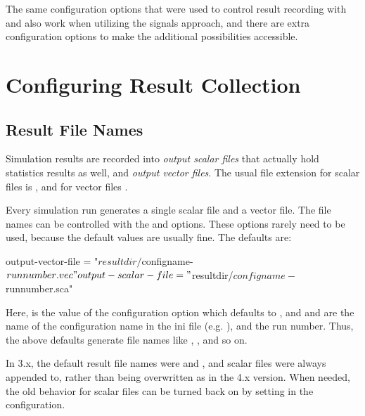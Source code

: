 The same configuration options that were used to control result recording
with  and  also work when utilizing
the signals approach, and there are extra configuration options to make
the additional possibilities accessible.


\section{Configuring Result Collection}
\label{sec:ana-sim:config-results}

\subsection{Result File Names}

Simulation results are recorded into \textit{output scalar files} that
actually hold statistics results as well, and \textit{output vector
files}. The usual file extension for scalar files is , and
for vector files .

Every simulation run generates a single scalar file and a vector file.
The file names can be controlled with the 
and  options. These options rarely need
to be used, because the default values are usually fine. The defaults
are:

\begin{inifile}
output-vector-file = "${resultdir}/${configname}-${runnumber}.vec"
output-scalar-file = "${resultdir}/${configname}-${runnumber}.sca"
\end{inifile}

Here,  is the value of the 
configuration option which defaults to , and
 and  are the name of
the configuration name in the ini file (e.g. ),
and the run number. Thus, the above defaults generate file names
like , ,
and so on.

\begin{note}
  In {\opp} 3.x, the default result file names were  and
  , and scalar files were always appended to, rather than
  being overwritten as in the 4.x version. When needed, the old behavior
  for scalar files can be turned back on by setting
   in the configuration.
\end{note}

